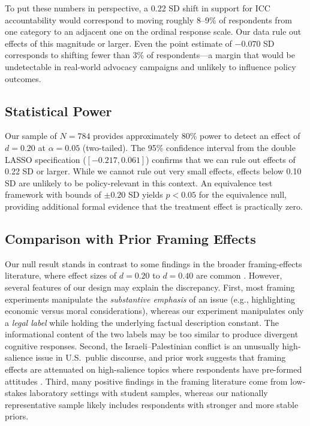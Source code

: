 \documentclass[12pt]{article}
\begin{document}
To put these numbers in perspective, a 0.22 SD shift in support for ICC accountability would correspond to moving roughly 8--9\% of respondents from one category to an adjacent one on the ordinal response scale. Our data rule out effects of this magnitude or larger. Even the point estimate of $-0.070$ SD corresponds to shifting fewer than 3\% of respondents---a margin that would be undetectable in real-world advocacy campaigns and unlikely to influence policy outcomes.

\subsection{Statistical Power}

Our sample of $N = 784$ provides approximately 80\% power to detect an effect of $d = 0.20$ at $\alpha = 0.05$ (two-tailed). The 95\% confidence interval from the double LASSO specification ($[-0.217, 0.061]$) confirms that we can rule out effects of 0.22 SD or larger. While we cannot rule out very small effects, effects below 0.10 SD are unlikely to be policy-relevant in this context. An equivalence test framework \citep{lakens2017equivalence} with bounds of $\pm 0.20$ SD yields $p < 0.05$ for the equivalence null, providing additional formal evidence that the treatment effect is practically zero.

\subsection{Comparison with Prior Framing Effects}

Our null result stands in contrast to some findings in the broader framing-effects literature, where effect sizes of $d = 0.20$ to $d = 0.40$ are common \citep{chong2007framing}. However, several features of our design may explain the discrepancy. First, most framing experiments manipulate the \emph{substantive emphasis} of an issue (e.g., highlighting economic versus moral considerations), whereas our experiment manipulates only a \emph{legal label} while holding the underlying factual description constant. The informational content of the two labels may be too similar to produce divergent cognitive responses. Second, the Israeli--Palestinian conflict is an unusually high-salience issue in U.S.\ public discourse, and prior work suggests that framing effects are attenuated on high-salience topics where respondents have pre-formed attitudes \citep{druckman2001implications}. Third, many positive findings in the framing literature come from low-stakes laboratory settings with student samples, whereas our nationally representative sample likely includes respondents with stronger and more stable priors.
\end{document}
